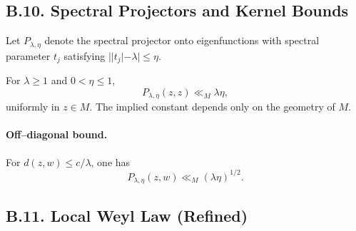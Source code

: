 %

%

%
\subsection*{B.10. Spectral Projectors and Kernel Bounds}

Let $P_{\lambda,\eta}$ denote the spectral projector onto eigenfunctions with
spectral parameter $t_j$ satisfying $||t_j|-\lambda|\le\eta$.

\begin{proposition}\label{prop:B10}
For $\lambda\ge1$ and $0<\eta\le1$,
\begin{equation}
  P_{\lambda,\eta}(z,z)\ll_{M} \lambda \eta,
\end{equation}
uniformly in $z\in M$. The implied constant depends only on the geometry of $M$.
\end{proposition}

\paragraph{Off–diagonal bound.}
For $d(z,w)\le c/\lambda$, one has
\begin{equation}
  P_{\lambda,\eta}(z,w) \ll_{M} (\lambda\eta)^{1/2}.
\end{equation}

%

%
\subsection*{B.11. Local Weyl Law (Refined)}


